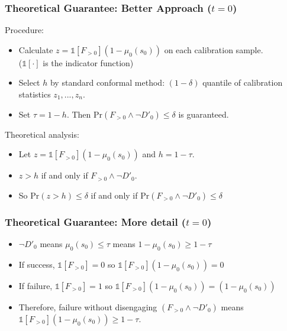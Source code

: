 \documentclass[handout]{beamer}
\begin{document}
\begin{frame}
    \frametitle{Theoretical Guarantee: Better Approach ($t=0$)}

    Procedure:
    \begin{itemize}
    \item Calculate $z = \mathbb{1}[F_{>0}](1 - \mu_0(s_0))$ on each calibration sample. \\
        ({\tiny $\mathbb{1}[\cdot]$ is the indicator function})
    \item Select $h$ by standard conformal method: $(1-\delta)$ quantile of calibration statistics $z_1,...,z_n$.
    \item Set $\tau = 1 - h$.  Then $\text{Pr}(F_{>0}\wedge\neg D'_0) \leq \delta$ is guaranteed.
    \end{itemize}

    Theoretical analysis:
    \begin{itemize}
    \item Let $z = \mathbb{1}[F_{>0}](1 - \mu_0(s_0))$ and $h = 1-\tau$.
    \item $z > h$ if and only if $F_{>0}\wedge\neg D'_0$.
    \item So $\text{Pr}(z > h) \leq \delta$ if and only if $\text{Pr}(F_{>0}\wedge\neg D'_0) \leq \delta$
    \end{itemize}

\end{frame}

\begin{frame}
    \frametitle{Theoretical Guarantee: More detail ($t=0$)}

    \begin{itemize}
    \item $\neg D'_0$ means $\mu_0(s_0)\leq\tau$ means $1-\mu_0(s_0)\geq 1 - \tau$
    \pause
    \item If success, $\mathbb{1}[F_{>0}]=0$ so $\mathbb{1}[F_{>0}](1 - \mu_0(s_0)) = 0$
    \pause
    \item If failure, $\mathbb{1}[F_{>0}]=1$ so $\mathbb{1}[F_{>0}](1 - \mu_0(s_0)) = (1 - \mu_0(s_0))$
    \pause
    \item Therefore, failure without disengaging $(F_{>0}\wedge\neg D'_0)$ means $\mathbb{1}[F_{>0}](1 - \mu_0(s_0))\geq 1 - \tau$.
    \end{itemize}

\end{frame}
\end{document}
